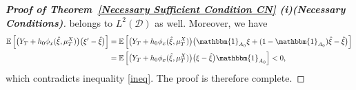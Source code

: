\documentclass[11pt,a4paper]{article}
\begin{document}
\begin{proof}[\textup{\textbf{Proof of Theorem~\ref{Necessary Sufficient Condition CN} (i)(Necessary Conditions)}}]
belongs to $L^2(\mathcal{D})$ as well. Moreover, we have
\begin{equation*}
    \begin{aligned}
    \mathbb{E} \left[ \big( Y_T +h_0\phi_x(\hat \xi,\mu_T^X)\big)\big( \xi'-\hat \xi\big)\right]&=
     \mathbb{E} \left[ \big(Y_T +h_0\phi_x(\hat \xi,\mu_T^X)\big)\big( \mathbbm{1} _{A_0}\xi+(1-\mathbbm{1} _{A_0})\hat \xi-\hat \xi\big) \right]\\
     &=\mathbb{E} \left[ \big( Y_T +h_0\phi_x(\hat \xi,\mu_T^X)\big) \big(\xi-\hat\xi\big) \mathbbm{1} _{A_0} \right]< 0,  
    \end{aligned}
\end{equation*}
which contradicts inequality \eqref{ineq}. The proof is therefore complete.
\end{proof}
\end{document}
